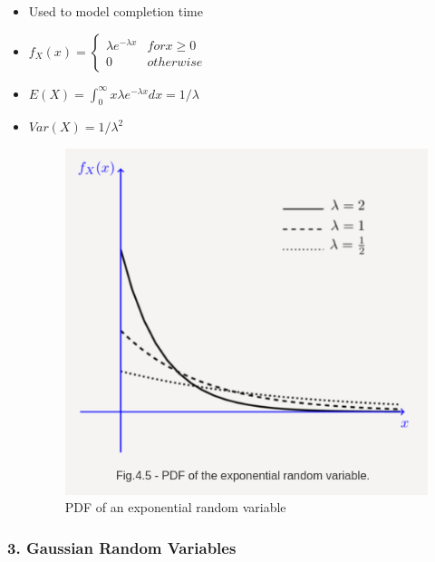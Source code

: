 \begin{itemize}
\item
  Used to model completion time
\item
  \(f_X(x) = \begin{cases}\lambda e^{-\lambda x} & for x\geq 0\\0 & otherwise\end{cases}\)
\item
  \(E(X) = \displaystyle\int_{0}^{\infty}x\lambda e^{-\lambda x}dx=1/\lambda\)
\item
  \(Var(X) = 1/\lambda ^2\)

  \begin{figure}
  \centering
  \includegraphics{Lecture 13 Notes e842fef9a3e0449fa78bac59b75dbc5c/Screenshot_from_2021-08-06_23-06-49.png}
  \caption{PDF of an exponential random variable}
  \end{figure}
\end{itemize}

\hypertarget{gaussian-random-variables}{%
\subsubsection{3. Gaussian Random
Variables}\label{gaussian-random-variables}}

